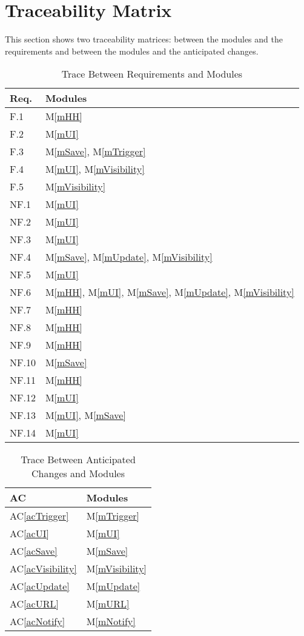 \documentclass[12pt, titlepage]{article}
\newcommand{\acref}[1]{AC\ref{#1}}
\newcommand{\mref}[1]{M\ref{#1}}
\begin{document}
\section{Traceability Matrix} \label{SecTM}

This section shows two traceability matrices: between the modules and the
requirements and between the modules and the anticipated changes.

\begin{table}[H]
\centering
\begin{tabular}{p{} p{}}
\toprule
\textbf{Req.} & \textbf{Modules}\\
\midrule
F.1 & \mref{mHH}\\
F.2 & \mref{mUI}\\
F.3 & \mref{mSave}, \mref{mTrigger}\\
F.4 & \mref{mUI}, \mref{mVisibility}\\
F.5 & \mref{mVisibility}\\
NF.1 & \mref{mUI}\\
NF.2 & \mref{mUI}\\
NF.3 & \mref{mUI}\\
NF.4 & \mref{mSave}, \mref{mUpdate}, \mref{mVisibility}\\
NF.5 & \mref{mUI}\\
NF.6 & \mref{mHH}, \mref{mUI}, \mref{mSave}, \mref{mUpdate}, 
\mref{mVisibility}\\
NF.7 & \mref{mHH}\\
NF.8 & \mref{mHH}\\
NF.9 & \mref{mHH}\\
NF.10 & \mref{mSave}\\
NF.11 & \mref{mHH}\\
NF.12 & \mref{mUI}\\
NF.13 & \mref{mUI}, \mref{mSave}\\
NF.14 & \mref{mUI}\\
\bottomrule
\end{tabular}
\caption{Trace Between Requirements and Modules}
\label{TblRT}
\end{table}

\begin{table}[H]
\centering
\begin{tabular}{p{} p{}}
\toprule
\textbf{AC} & \textbf{Modules}\\
\midrule
\acref{acTrigger} & \mref{mTrigger}\\
\acref{acUI} & \mref{mUI}\\
\acref{acSave} & \mref{mSave}\\
\acref{acVisibility} & \mref{mVisibility}\\
\acref{acUpdate} & \mref{mUpdate}\\
\acref{acURL} & \mref{mURL}\\
\acref{acNotify} & \mref{mNotify}\\
\bottomrule
\end{tabular}
\caption{Trace Between Anticipated Changes and Modules}
\label{TblACT}
\end{table}
\end{document}
